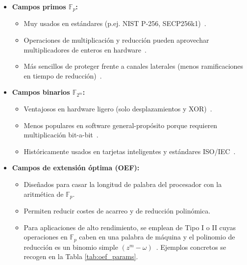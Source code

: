 \begin{itemize}
  \item \textbf{Campos primos \(\mathbb{F}_p\):}  
    \begin{itemize}
      \item Muy usados en estándares (p.ej. NIST P-256, SECP256k1)~\citep{nist186-4}.
      \item Operaciones de multiplicación y reducción pueden aprovechar multiplicadores de enteros en hardware~\citep{hankerson2004}.  
      \item Más sencillos de proteger frente a canales laterales (menos ramificaciones en tiempo de reducción)~\citep{kocher-sca}.
    \end{itemize}
  \item \textbf{Campos binarios \(\mathbb{F}_{2^m}\):}  
    \begin{itemize}
      \item Ventajosos en hardware ligero (solo desplazamientos y XOR)~\citep{secg2}.
      \item Menos populares en software general-propósito porque requieren multiplicación bit-a-bit~\citep{hankerson2004}.  
      \item Históricamente usados en tarjetas inteligentes y estándares ISO/IEC~\citep{secg2}.  
    \end{itemize}
  \item \textbf{Campos de extensión óptima (OEF):}  
    \begin{itemize}
      \item Diseñados para casar la longitud de palabra del procesador con la aritmética de \(\mathbb{F}_p\).  
      \item Permiten reducir costes de acarreo y de reducción polinómica.  
      \item Para aplicaciones de alto rendimiento, se emplean de Tipo I o II cuyas operaciones en \(\mathbb{F}_p\) caben en una palabra de máquina y el polinomio de reducción es un binomio simple \((z^m-\omega)\)~\citep{militzer-oef,barreto-oef}. Ejemplos concretos se recogen en la Tabla \ref{tab:oef_params}.
    \end{itemize}
\end{itemize}

